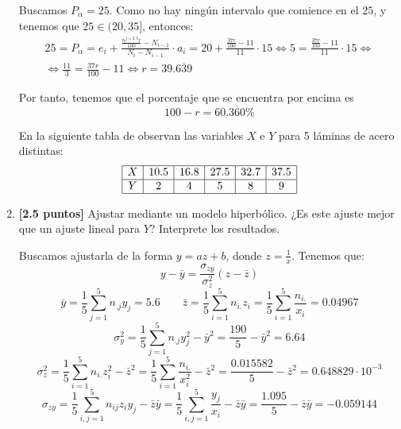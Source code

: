 \documentclass[12pt]{article}
\begin{document}
\begin{ejercicio}
\begin{enumerate}
        Buscamos $P_\alpha = 25$. Como no hay ningún intervalo que comience en el $25$, y tenemos que $25\in (20,35]$, entonces:
        \begin{multline*}
            25=P_\alpha = e_{i} + \frac{\frac{n^{j=2,3}r}{100}-N_{i-1}}{N_{i}-N_{i-1}}\cdot a_i
            = 20 + \frac{\frac{37r}{100}-11}{11}\cdot 15
            \Longleftrightarrow 5=\frac{\frac{37r}{100}-11}{11}\cdot 15
            \Longleftrightarrow \\ \Longleftrightarrow
            \frac{11}{3}=\frac{37r}{100}-11
            \Longleftrightarrow
            r=39.\overline{639}
        \end{multline*}

        Por tanto, tenemos que el porcentaje que se encuentra por encima es $$100-r=60.\overline{360}\%$$


        \vspace{1.5 cm}
        En la siguiente tabla de observan las variables $X$ e $Y$ para 5 láminas de acero distintas:
        \begin{equation*}
            \begin{array}{|c|c|c|c|c|c|}
                \hline
                X & 10.5 & 16.8 & 27.5 & 32.7 & 37.5 \\ \hline
                Y & 2 & 4 & 5 & 8 & 9 \\ \hline
            \end{array}
        \end{equation*}
        \item \textbf{[2.5 puntos]} Ajustar mediante un modelo hiperbólico. ¿Es este ajuste mejor que un ajuste lineal para $Y$? Interprete los resultados.

        Buscamos ajustarla de la forma $y=az+b$, donde $z=\frac{1}{x}$. Tenemos que:
        \begin{equation*}
            y-\bar{y}=\frac{\sigma_{zy}}{\sigma_z^2}(z-\bar{z})    
        \end{equation*}
        \begin{equation*}
            \bar{y}=\frac{1}{5}\sum_{j=1}^5 n_{.j}y_j = 5.6
            \qquad
            \bar{z}=\frac{1}{5}\sum_{i=1}^5 n_{i.}z_i =\frac{1}{5}\sum_{i=1}^5 \frac{n_{i.}}{x_i} = 0.04967
        \end{equation*}
        \begin{equation*}
            \sigma_{y}^2=\frac{1}{5}\sum_{j=1}^5 n_{.j}y_j^2 -\bar{y}^2 = \frac{190}{5} -\bar{y}^2=6.64
        \end{equation*}
        \begin{equation*}
            \sigma_{z}^2=\frac{1}{5}\sum_{i=1}^5 n_{i.}z_i^2 -\bar{z}^2 =
            \frac{1}{5}\sum_{i=1}^5 \frac{n_{i.}}{x_i^2} -\bar{z}^2 = \frac{0.015582}{5} -\bar{z}^2=0.648829\cdot 10^{-3}
        \end{equation*}
        \begin{equation*}
            \sigma_{zy}=\frac{1}{5}\sum_{i,j=1}^5 n_{ij}z_iy_j -\bar{z}\bar{y} =
            \frac{1}{5}\sum_{i,j=1}^5 \frac{y_j}{x_i} -\bar{z}\bar{y} = \frac{1.095}{5} -\bar{z}\bar{y}=-0.059144
        \end{equation*}


\end{enumerate}
\end{ejercicio}
\end{document}

